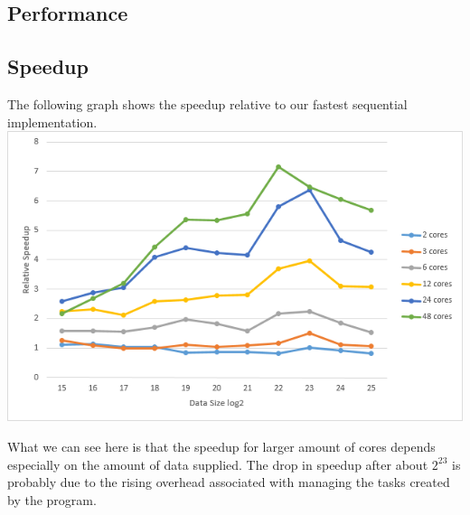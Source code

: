 \subsection{Performance}
\subsection{Speedup}
The following graph shows the speedup relative to our fastest sequential implementation.
\includegraphics{rec_openmp_speedup.png}

What we can see here is that the speedup for larger amount of cores depends especially on the amount of data supplied.
The drop in speedup after about \(2^{23}\) is probably due to the rising overhead associated with managing the tasks created by the program.
